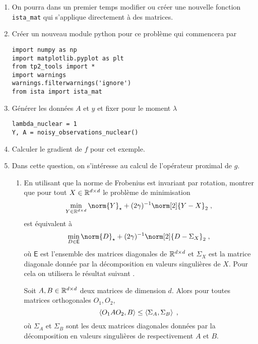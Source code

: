 \documentclass[a4paper,french,12pt]{article}
\begin{document}
\begin{enumerate}[resume]
\item On pourra dans un premier temps modifier ou créer une nouvelle fonction \lstinline+ista_mat+ qui s'applique directement à des matrices. 
\item Créer un nouveau module python pour ce problème qui commencera par
\begin{lstlisting}
import numpy as np
import matplotlib.pyplot as plt
from tp2_tools import *
import warnings
warnings.filterwarnings('ignore')
from ista import ista_mat
\end{lstlisting}
\item Générer les données $A$ et $y$ et fixer pour le moment $\lambda$
  \begin{lstlisting}
lambda_nuclear = 1
Y, A = noisy_observations_nuclear()
  \end{lstlisting}
\item Calculer le gradient de $f$ pour cet exemple.
\item Dans cette question, on s'intéresse au calcul de l'opérateur proximal de $g$.
  \begin{enumerate}
  \item En utilisant que la norme de Frobenius est invariant par
    rotation, montrer que pour tout $X \in \mathbb{R}^{d \times d}$  le problème de minimisation
    \begin{equation}
      \label{eq:prox_nuclea_proof_1}
      \min_{Y \in \rset^{d\times d} } \norm{Y}_{\star} +(2\gamma)^{-1} \norm[2]{Y-X}_2 \eqsp,
    \end{equation}
    est équivalent à  
          \begin{equation}
      \label{eq:prox_nuclea_proof_2}
      \min_{D \in \mathsf{E}} \norm{D}_{\star} +(2\gamma)^{-1} \norm[2]{D-\Sigma_X}_2 \eqsp,
    \end{equation}
    où $\mathsf{E}$ est l'ensemble des matrices diagonales de $\mathbb{R}^{d \times d}$ et $\Sigma_X$ est la matrice diagonale donnée par la décomposition en valeurs singulières de $X$.
    Pour cela on utilisera le résultat suivant \cite{vonNeumann_1937}.
    \begin{theoreme}
      \label{theofr:van_neu_svd}
      Soit $A,B \in \mathbb{R}^{d \times d}$ deux matrices de dimension $d$. Alors pour toutes matrices orthogonales $O_1,O_2$,
      \begin{equation*}
        \left\langle O_1 A O_2,B \right\rangle \leq \left\langle\Sigma_A,\Sigma_B \right\rangle \;,
      \end{equation*}
      où $\Sigma_A$ et $\Sigma_B$ sont les deux matrices diagonales données par la décomposition en valeurs singulières de respectivement $A$ et $B$.

\end{theoreme}
\end{enumerate}
\end{enumerate}
\end{document}
